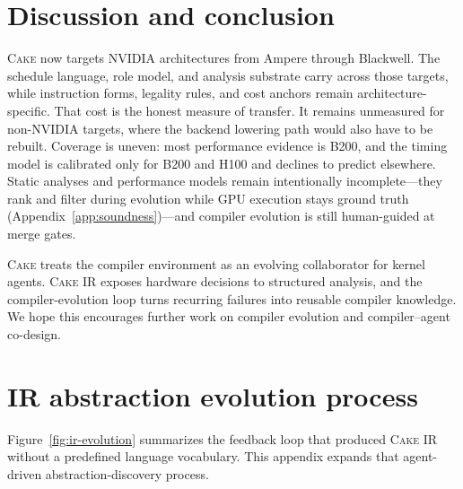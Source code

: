 \documentclass[11pt]{article}
\newcommand{\cake}{\textsc{Cake}}
\newcommand{\cakeir}{\textsc{Cake IR}}
\begin{document}
\section{Discussion and conclusion}
\label{sec:discussion}

\cake{} now targets NVIDIA architectures from Ampere through Blackwell. The
schedule language, role model, and analysis substrate carry across those
targets, while instruction forms, legality rules, and cost anchors remain
architecture-specific. That cost is the honest measure of transfer. It remains
unmeasured for non-NVIDIA targets, where the backend lowering path would also
have to be rebuilt. Coverage is uneven: most performance evidence is B200, and
the timing model is calibrated only for B200 and H100 and declines to predict
elsewhere. Static analyses and performance models remain intentionally
incomplete---they rank and filter during evolution while GPU execution stays
ground truth
(Appendix~\ref{app:soundness})---and compiler evolution is still human-guided at
merge gates.

\cake{} treats the compiler environment as an evolving collaborator for kernel
agents. \cakeir{} exposes hardware decisions to structured analysis, and the
compiler-evolution loop turns recurring failures into reusable compiler
knowledge. We hope this encourages further work on compiler evolution and
compiler--agent co-design.

{\small


}

\appendix

\section{IR abstraction evolution process}
\label{app:ir-evolution}

Figure~\ref{fig:ir-evolution} summarizes the feedback loop that produced
\cakeir{} without a predefined language vocabulary. This appendix expands that
agent-driven abstraction-discovery process.
\end{document}

